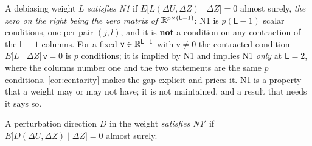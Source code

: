 %
%

\begin{assumption}\label{ass:centering}
A debiasing weight $L$ \emph{satisfies N1} if
$E\big[L(\Delta U,\Delta Z)\mid\Delta Z\big]=0$ almost surely, \emph{the zero on the right being the
zero matrix of $\mathbb{R}^{p\times(\mathsf L-1)}$}: N1 is $p(\mathsf L-1)$ scalar conditions, one per pair
$(j,l)$, and it is \textbf{not} a condition on any contraction of the $\mathsf L-1$ columns. For a
fixed $\mathsf v\in\mathbb{R}^{\mathsf L-1}$ with $\mathsf v\ne0$ the contracted condition
$E\big[L\mid\Delta Z\big]\,\mathsf v=0$ is $p$ conditions; it is implied by N1 and implies N1
\emph{only} at $\mathsf L=2$, where the columns number one and the two statements are the same $p$
conditions. \cref{cor:centarity} makes the gap explicit and prices it. N1 is a property that a weight
may or may not have; it is not maintained, and a result that needs it says so.
\end{assumption}

\begin{assumption}\label{ass:centeringdir}
A perturbation direction $D$ in the weight \emph{satisfies N1$'$} if
$E\big[D(\Delta U,\Delta Z)\mid\Delta Z\big]=0$ almost surely.
\end{assumption}

